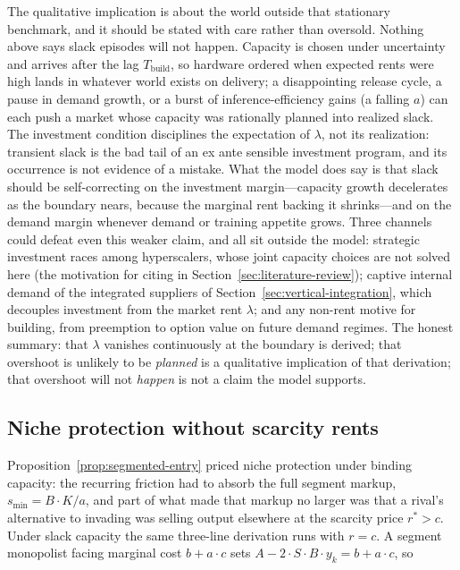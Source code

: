 \documentclass[11pt]{article}
\begin{document}
The qualitative implication is about the world outside that stationary benchmark, and it should be stated with care rather than oversold. Nothing above says slack episodes will not happen. Capacity is chosen under uncertainty and arrives after the lag $T_{\mathrm{build}}$, so hardware ordered when expected rents were high lands in whatever world exists on delivery; a disappointing release cycle, a pause in demand growth, or a burst of inference-efficiency gains (a falling $a$) can each push a market whose capacity was rationally planned into realized slack. The investment condition disciplines the expectation of $\lambda$, not its realization: transient slack is the bad tail of an ex ante sensible investment program, and its occurrence is not evidence of a mistake. What the model does say is that slack should be self-correcting on the investment margin---capacity growth decelerates as the boundary nears, because the marginal rent backing it shrinks---and on the demand margin whenever demand or training appetite grows. Three channels could defeat even this weaker claim, and all sit outside the model: strategic investment races among hyperscalers, whose joint capacity choices are not solved here (the motivation for citing \citet{besankoDoraszelski2004} in Section~\ref{sec:literature-review}); captive internal demand of the integrated suppliers of Section~\ref{sec:vertical-integration}, which decouples investment from the market rent $\lambda$; and any non-rent motive for building, from preemption to option value on future demand regimes. The honest summary: that $\lambda$ vanishes continuously at the boundary is derived; that overshoot is unlikely to be \emph{planned} is a qualitative implication of that derivation; that overshoot will not \emph{happen} is not a claim the model supports.

\subsection{Niche protection without scarcity rents}
\label{subsec:slack-niches}

Proposition~\ref{prop:segmented-entry} priced niche protection under binding capacity: the recurring friction had to absorb the full segment markup, $s_{\min}=B\cdot K/a$, and part of what made that markup no larger was that a rival's alternative to invading was selling output elsewhere at the scarcity price $r^{*}>c$. Under slack capacity the same three-line derivation runs with $r=c$. A segment monopolist facing marginal cost $b+a\cdot c$ sets $A-2\cdot S\cdot B\cdot y_k=b+a\cdot c$, so
\end{document}
